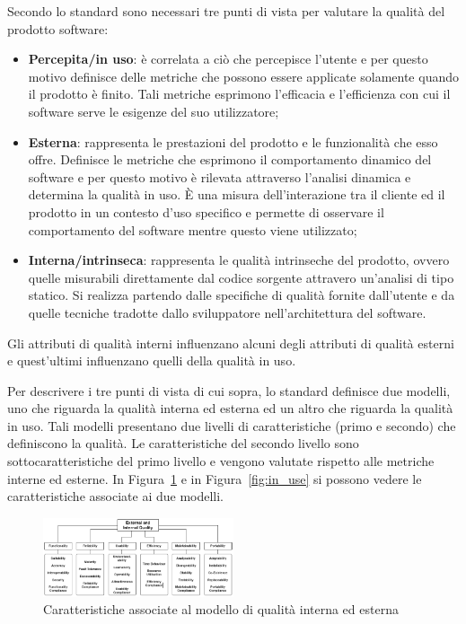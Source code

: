 Secondo lo standard sono necessari tre punti di vista per valutare la qualità del prodotto software:
\begin{itemize}
	\item \textbf{Percepita/in uso}: è correlata a ciò che percepisce l'utente e per questo motivo definisce delle metriche che possono essere applicate solamente quando il prodotto è finito. Tali metriche esprimono l'efficacia e l'efficienza con cui il software serve le esigenze del suo utilizzatore;
	 
	\item \textbf{Esterna}: rappresenta le prestazioni del prodotto e le funzionalità che esso offre. Definisce le metriche che esprimono il comportamento dinamico del software e per questo motivo è rilevata attraverso l'analisi dinamica e determina la qualità in uso. È una misura dell'interazione tra il cliente ed il prodotto in un contesto d'uso specifico e permette di osservare il comportamento del software mentre questo viene utilizzato;
	
	\item \textbf{Interna/intrinseca}: rappresenta le qualità intrinseche del prodotto, ovvero quelle misurabili direttamente dal codice sorgente attravero un'analisi di tipo statico. Si realizza partendo dalle specifiche di qualità fornite dall'utente e da quelle tecniche tradotte dallo sviluppatore nell'architettura del software.
\end{itemize}

Gli attributi di qualità interni influenzano alcuni degli attributi di qualità esterni e quest'ultimi influenzano quelli della qualità in uso.

Per descrivere i tre punti di vista di cui sopra, lo standard definisce due modelli, uno che riguarda la qualità interna ed esterna ed un altro che riguarda la qualità in uso. Tali modelli presentano due livelli di caratteristiche (primo e secondo) che definiscono la qualità. Le caratteristiche del secondo livello sono sottocaratteristiche del primo livello e vengono valutate rispetto alle metriche interne ed esterne. In Figura~\ref{fig:int_ext} e in Figura~\ref{fig:in_use} si possono vedere le caratteristiche associate ai due modelli.

\begin{figure}[h!]
	\centering
	\includegraphics[width=0.50\textwidth]{img/int_ext.png}
	\caption{Caratteristiche associate al modello di qualità interna ed esterna}
	\label{fig:int_ext}
\end{figure}

